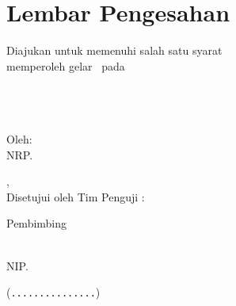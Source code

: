 \chapter*{Lembar Pengesahan}

{
	\BgThispage
	\setlength{\parindent}{0pt}
	\setlength{\parskip}{0.5\baselineskip}

	\vspace{-1\baselineskip}

	\begin{center}
		\begin{minipage}{0.9\linewidth}
			\centering
			\textbf{\MakeUppercase{\titleBahasa}}
		\end{minipage}

		\vspace{1.25em}

		\textbf{\MakeUppercase{\documentNameBahasa}}

		Diajukan untuk memenuhi salah satu syarat \\
		memperoleh gelar \degreeName\ pada \\
		\programName \\
		\departmentNameBahasa \\
		\facultyNameBahasa \\
		\campusName

		\vspace{1.25em}

		Oleh: \textbf{\MakeUppercase{\theAuthor}} \\
		NRP. \theAuthorId

		\vspace{1.25em}

		\theCity, \theMonth\ \theYear \\
		Disetujui oleh Tim Penguji \documentNameBahasa:

		\vspace{0.75em}

		Pembimbing

		\vspace{0.75em}

		\begin{minipage}{0.875\linewidth}
			\begin{minipage}{0.6\linewidth}
				\supervisor \\
				NIP. \supervisorId
			\end{minipage}
			\hfill
			\begin{minipage}{0.275\linewidth}
				\begin{flushright}
					(\texttt{...............})
				\end{flushright}
			\end{minipage}
		\end{minipage}


\end{center}}
